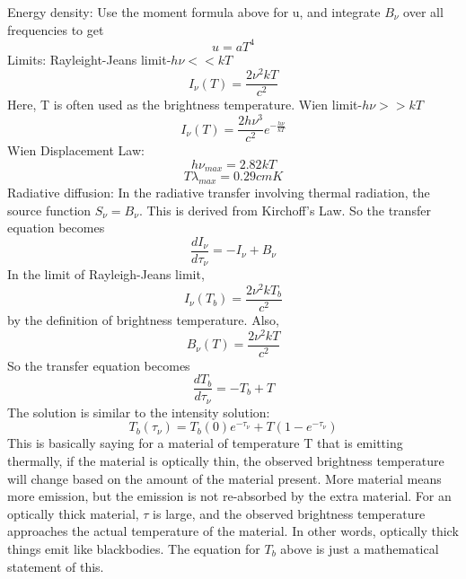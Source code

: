 Energy density:\newline
Use the moment formula above for u, and integrate $B_{\nu}$ over all frequencies to get 
\begin{displaymath}u=aT^4\end{displaymath}
Limits:
Rayleight-Jeans limit-$h\nu<<kT$
\begin{displaymath}I_{\nu}(T)=\frac{2\nu^2kT}{c^2}\end{displaymath}
Here, T is often used as the brightness temperature.
Wien limit-$h\nu>>kT$
\begin{displaymath}I_{\nu}(T)=\frac{2h\nu^3}{c^2}e^{-\frac{h\nu}{kT}}\end{displaymath}
Wien Displacement Law:
\begin{displaymath}h\nu_{max}=2.82kT\end{displaymath}
\begin{displaymath}T\lambda_{max}=0.29cmK\end{displaymath}
Radiative diffusion:
In the radiative transfer involving thermal radiation, the source function $S_{\nu}=B_{\nu}$.  
This is derived from Kirchoff's Law.  
So the transfer equation becomes 
\begin{displaymath}\frac{dI_{\nu}}{d\tau_{\nu}}=-I_{\nu}+B_{\nu}\end{displaymath}
In the limit of Rayleigh-Jeans limit, 
\begin{displaymath}I_{\nu}(T_b)=\frac{2\nu^2kT_b}{c^2}\end{displaymath}
by the definition of brightness temperature.  Also, 
\begin{displaymath}B_{\nu}(T)=\frac{2\nu^2kT}{c^2}\end{displaymath}
So the transfer equation becomes
\begin{displaymath}\frac{dT_b}{d\tau_{\nu}}=-T_b+T\end{displaymath}
The solution is similar to the intensity solution:
\begin{displaymath}T_b(\tau_{\nu})=T_b(0)e^{-\tau_{\nu}}+T(1-e^{-\tau_{\nu}})\end{displaymath}
This is basically saying for a material of temperature T that is emitting thermally, if the 
material is optically thin, the observed brightness temperature will change based on the amount 
of the material present.  More material means more emission, but the emission is not re-absorbed 
by the extra material.  For an optically thick material, $\tau$ is large, and the observed 
brightness temperature approaches the actual temperature of the material.  In other words, 
optically thick things emit like blackbodies.  The equation for $T_b$ above is just a mathematical 
statement of this.

